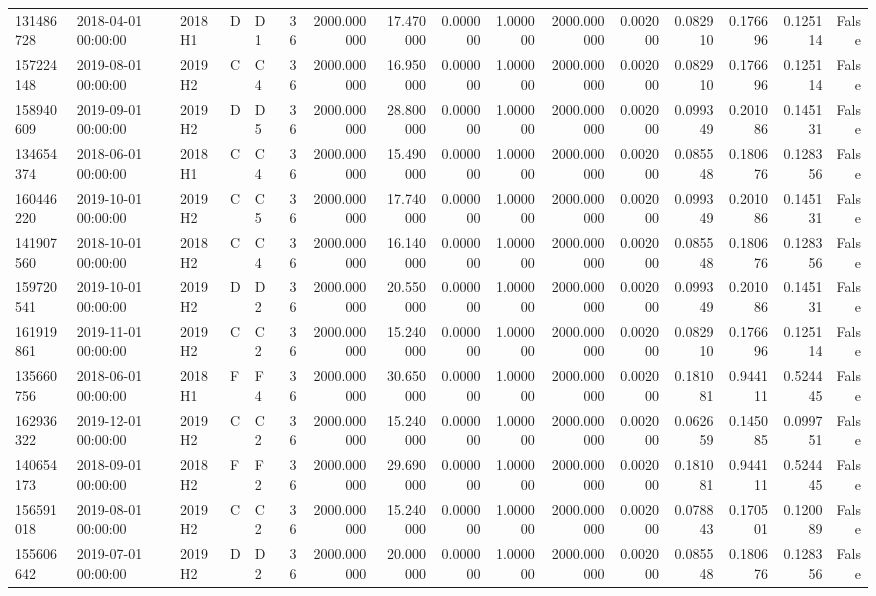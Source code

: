 \begin{tabular}{lllllrrrrrrrrrrr}
131486728 & 2018-04-01 00:00:00 & 2018H1 & D & D1 & 36 & 2000.000000 & 17.470000 & 0.000000 & 1.000000 & 2000.000000 & 0.002000 & 0.082910 & 0.176696 & 0.125114 & False \\
157224148 & 2019-08-01 00:00:00 & 2019H2 & C & C4 & 36 & 2000.000000 & 16.950000 & 0.000000 & 1.000000 & 2000.000000 & 0.002000 & 0.082910 & 0.176696 & 0.125114 & False \\
158940609 & 2019-09-01 00:00:00 & 2019H2 & D & D5 & 36 & 2000.000000 & 28.800000 & 0.000000 & 1.000000 & 2000.000000 & 0.002000 & 0.099349 & 0.201086 & 0.145131 & False \\
134654374 & 2018-06-01 00:00:00 & 2018H1 & C & C4 & 36 & 2000.000000 & 15.490000 & 0.000000 & 1.000000 & 2000.000000 & 0.002000 & 0.085548 & 0.180676 & 0.128356 & False \\
160446220 & 2019-10-01 00:00:00 & 2019H2 & C & C5 & 36 & 2000.000000 & 17.740000 & 0.000000 & 1.000000 & 2000.000000 & 0.002000 & 0.099349 & 0.201086 & 0.145131 & False \\
141907560 & 2018-10-01 00:00:00 & 2018H2 & C & C4 & 36 & 2000.000000 & 16.140000 & 0.000000 & 1.000000 & 2000.000000 & 0.002000 & 0.085548 & 0.180676 & 0.128356 & False \\
159720541 & 2019-10-01 00:00:00 & 2019H2 & D & D2 & 36 & 2000.000000 & 20.550000 & 0.000000 & 1.000000 & 2000.000000 & 0.002000 & 0.099349 & 0.201086 & 0.145131 & False \\
161919861 & 2019-11-01 00:00:00 & 2019H2 & C & C2 & 36 & 2000.000000 & 15.240000 & 0.000000 & 1.000000 & 2000.000000 & 0.002000 & 0.082910 & 0.176696 & 0.125114 & False \\
135660756 & 2018-06-01 00:00:00 & 2018H1 & F & F4 & 36 & 2000.000000 & 30.650000 & 0.000000 & 1.000000 & 2000.000000 & 0.002000 & 0.181081 & 0.944111 & 0.524445 & False \\
162936322 & 2019-12-01 00:00:00 & 2019H2 & C & C2 & 36 & 2000.000000 & 15.240000 & 0.000000 & 1.000000 & 2000.000000 & 0.002000 & 0.062659 & 0.145085 & 0.099751 & False \\
140654173 & 2018-09-01 00:00:00 & 2018H2 & F & F2 & 36 & 2000.000000 & 29.690000 & 0.000000 & 1.000000 & 2000.000000 & 0.002000 & 0.181081 & 0.944111 & 0.524445 & False \\
156591018 & 2019-08-01 00:00:00 & 2019H2 & C & C2 & 36 & 2000.000000 & 15.240000 & 0.000000 & 1.000000 & 2000.000000 & 0.002000 & 0.078843 & 0.170501 & 0.120089 & False \\
155606642 & 2019-07-01 00:00:00 & 2019H2 & D & D2 & 36 & 2000.000000 & 20.000000 & 0.000000 & 1.000000 & 2000.000000 & 0.002000 & 0.085548 & 0.180676 & 0.128356 & False \\

\end{tabular}
